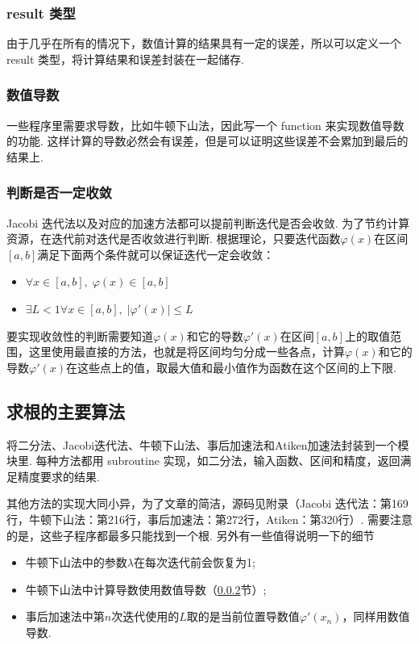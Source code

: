 \documentclass{article}
\begin{document}
	\subsubsection{result 类型}
	由于几乎在所有的情况下，数值计算的结果具有一定的误差，所以可以定义一个 result 类型，将计算结果和误差封装在一起储存.
	
	\subsubsection{数值导数}\label{sbbs:numerical_derivative}
	一些程序里需要求导数，比如牛顿下山法，因此写一个 function 来实现数值导数的功能. 这样计算的导数必然会有误差，但是可以证明这些误差不会累加到最后的结果上.
	
	\subsubsection{判断是否一定收敛}
	Jacobi 迭代法以及对应的加速方法都可以提前判断迭代是否会收敛. 为了节约计算资源，在迭代前对迭代是否收敛进行判断. 根据理论，只要迭代函数$\varphi(x)$在区间$[a, b]$满足下面两个条件就可以保证迭代一定会收敛：
	\begin{itemize}
		\item $\forall x\in[a, b],\;\varphi(x)\in[a, b]$
		\item $\exists L<1\forall x\in[a, b],\;|\varphi'(x)|\le L$
	\end{itemize}
	要实现收敛性的判断需要知道$\varphi(x)$和它的导数$\varphi'(x)$在区间$[a,b]$上的取值范围，这里使用最直接的方法，也就是将区间均匀分成一些各点，计算$\varphi(x)$和它的导数$\varphi'(x)$在这些点上的值，取最大值和最小值作为函数在这个区间的上下限. 
	
	\subsection{求根的主要算法}
	将二分法、Jacobi迭代法、牛顿下山法、事后加速法和Atiken加速法封装到一个模块里. 每种方法都用 subroutine 实现，如二分法，输入函数、区间和精度，返回满足精度要求的结果.
	
	其他方法的实现大同小异，为了文章的简洁，源码见附录（Jacobi 迭代法：第169行，牛顿下山法：第216行，事后加速法：第272行，Atiken：第320行）. 需要注意的是，这些子程序都最多只能找到一个根. 另外有一些值得说明一下的细节
	\begin{itemize}
		\item 牛顿下山法中的参数$\lambda$在每次迭代前会恢复为1;
		\item 牛顿下山法中计算导数使用数值导数（\ref{sbbs:numerical_derivative}节）;
		\item 事后加速法中第$n$次迭代使用的$L$取的是当前位置导数值$\varphi'(x_n)$，同样用数值导数.
	\end{itemize}
\end{document}
